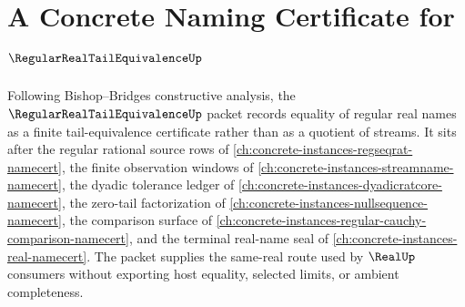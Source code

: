 \chapter{A Concrete Naming Certificate for $\RegularRealTailEquivalenceUp$}
\label{ch:concrete-instances-regular-real-tail-equivalence-namecert}

Following Bishop--Bridges constructive analysis, the $\RegularRealTailEquivalenceUp$ packet records equality of regular real names as a finite tail-equivalence certificate rather than as a quotient of streams. It sits after the regular rational source rows of \autoref{ch:concrete-instances-regseqrat-namecert}, the finite observation windows of \autoref{ch:concrete-instances-streamname-namecert}, the dyadic tolerance ledger of \autoref{ch:concrete-instances-dyadicratcore-namecert}, the zero-tail factorization of \autoref{ch:concrete-instances-nullsequence-namecert}, the comparison surface of \autoref{ch:concrete-instances-regular-cauchy-comparison-namecert}, and the terminal real-name seal of \autoref{ch:concrete-instances-real-namecert}. The packet supplies the same-real route used by $\RealUp$ consumers without exporting host equality, selected limits, or ambient completeness.

